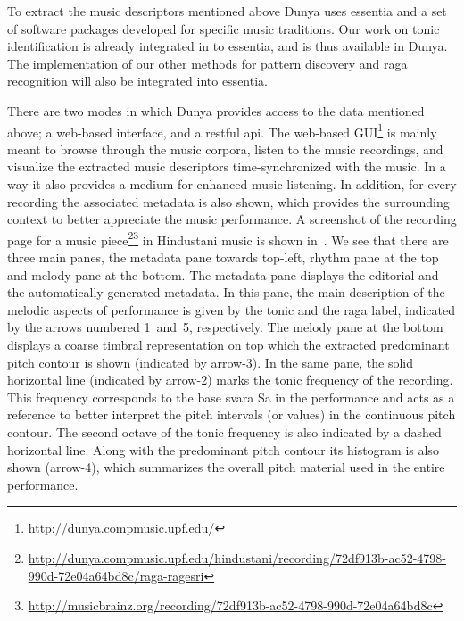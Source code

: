 To extract the music descriptors mentioned above Dunya uses \gls{essentia} and a set of software packages developed for specific music traditions. Our work on tonic identification is already integrated in to \gls{essentia}, and is thus available in Dunya. The implementation of our other methods for pattern discovery and \gls{raga} recognition will also be integrated into \gls{essentia}. 

There are two modes in which Dunya provides access to the data mentioned above; a web-based interface, and a restful \acrshort{api}. The web-based GUI\footnote{\url{http://dunya.compmusic.upf.edu/}} is mainly meant to browse through the music corpora, listen to the music recordings, and visualize the extracted music descriptors time-synchronized with the music. In a way it also provides a medium for enhanced music listening. In addition, for every recording the associated metadata is also shown, which provides the surrounding context to better appreciate the music performance. A screenshot of the recording page for a music piece\footnote{\url{http://dunya.compmusic.upf.edu/hindustani/recording/72df913b-ac52-4798-990d-72e04a64bd8c/raga-ragesri}}\footnote{\url{http://musicbrainz.org/recording/72df913b-ac52-4798-990d-72e04a64bd8c}} in Hindustani music is shown in~. We see that there are three main panes, the metadata pane towards top-left, rhythm pane at the top and melody pane at the bottom. The metadata pane displays the editorial and the automatically generated metadata. In this pane, the main description of the melodic aspects of performance is given by the tonic and the \gls{raga} label, indicated by the arrows numbered 1~and~5, respectively. The melody pane at the bottom displays a coarse timbral representation on top which the extracted predominant pitch contour is shown (indicated by arrow-3).  In the same pane, the solid horizontal line (indicated by arrow-2) marks the tonic frequency of the recording. This frequency corresponds to the base \gls{svara} Sa in the performance and acts as a reference to better interpret the pitch intervals (or values) in the continuous pitch contour. The second octave of the tonic frequency is also indicated by a dashed horizontal line. Along with the predominant pitch contour its histogram is also shown (arrow-4), which summarizes the overall pitch material used in the entire performance. 

